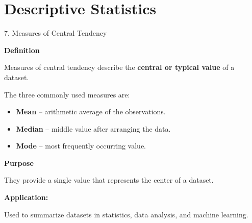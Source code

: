 
\section{Descriptive Statistics}


\begin{frame}{7. Measures of Central Tendency}

\textbf{Definition}

Measures of central tendency describe the \textbf{central or typical
value} of a dataset.

\vspace{0.4cm}

The three commonly used measures are:

\begin{itemize}
    \item \textbf{Mean} -- arithmetic average of the observations.
    \item \textbf{Median} -- middle value after arranging the data.
    \item \textbf{Mode} -- most frequently occurring value.
\end{itemize}

\vspace{0.4cm}

\textbf{Purpose}

They provide a single value that represents the center of a dataset.

\vspace{0.3cm}

\textbf{Application:}

Used to summarize datasets in statistics, data analysis,
and machine learning.

\end{frame}



